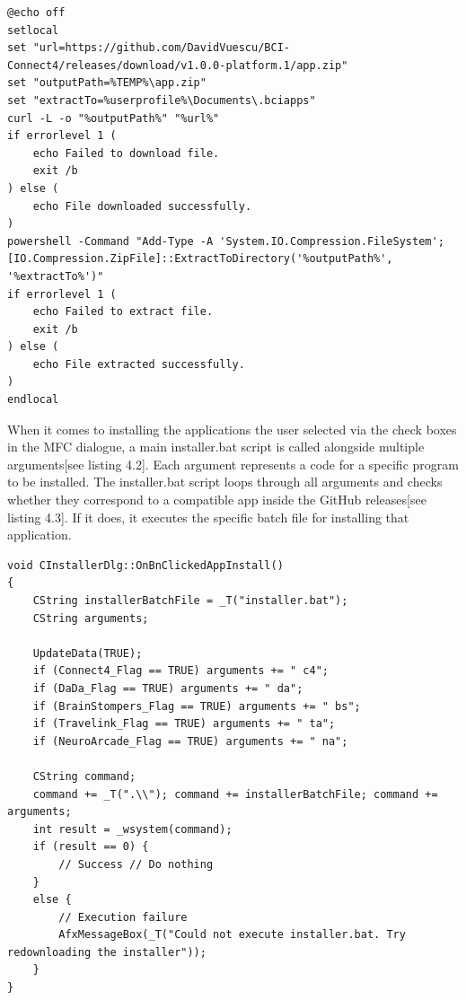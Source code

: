 \begin{lstlisting}[language={[Sharp]C}, caption={c4.bat, the script file used for installing the Connect4 Game}, label={Script}]
@echo off
setlocal
set "url=https://github.com/DavidVuescu/BCI-Connect4/releases/download/v1.0.0-platform.1/app.zip"
set "outputPath=%TEMP%\app.zip"
set "extractTo=%userprofile%\Documents\.bciapps"
curl -L -o "%outputPath%" "%url%"
if errorlevel 1 (
    echo Failed to download file.
    exit /b
) else (
    echo File downloaded successfully.
)
powershell -Command "Add-Type -A 'System.IO.Compression.FileSystem'; [IO.Compression.ZipFile]::ExtractToDirectory('%outputPath%', '%extractTo%')"
if errorlevel 1 (
    echo Failed to extract file.
    exit /b
) else (
    echo File extracted successfully.
)
endlocal
\end{lstlisting}

When it comes to installing the applications the user selected via the check boxes in the MFC dialogue, a main installer.bat script is called alongside multiple arguments[see listing 4.2]. Each argument represents a code for a specific program to be installed. The installer.bat script loops through all arguments and checks whether they correspond to a compatible app inside the GitHub releases[see listing 4.3]. If it does, it executes the specific batch file for installing that application.

\begin{lstlisting}[language={[Sharp]C}, caption={Action Handler for the Install Apps button}, label={Script}]
void CInstallerDlg::OnBnClickedAppInstall()
{
	CString installerBatchFile = _T("installer.bat");
	CString arguments;

	UpdateData(TRUE);
	if (Connect4_Flag == TRUE) arguments += " c4";
	if (DaDa_Flag == TRUE) arguments += " da";
	if (BrainStompers_Flag == TRUE) arguments += " bs";
	if (Travelink_Flag == TRUE) arguments += " ta";
	if (NeuroArcade_Flag == TRUE) arguments += " na";

	CString command;
	command += _T(".\\"); command += installerBatchFile; command += arguments;
	int result = _wsystem(command);
	if (result == 0) {
		// Success // Do nothing
	}
	else {
		// Execution failure
		AfxMessageBox(_T("Could not execute installer.bat. Try redownloading the installer"));
	}
}
\end{lstlisting}

